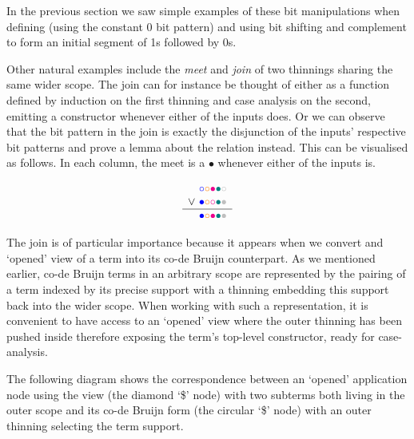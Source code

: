 In the previous section we saw simple examples of these bit manipulations when
defining  (using the constant 0 bit pattern) and
 using bit shifting and complement to form an initial segment
of 1s followed by 0s.

Other natural examples include the \emph{meet} and \emph{join} of two thinnings
sharing the same wider scope.
%
The join can for instance be thought of either as a function defined by induction
on the first thinning and case analysis on the second, emitting a 
constructor whenever either of the inputs does.
%
Or we can observe that the bit pattern in the join is exactly the disjunction of
the inputs' respective bit patterns and prove a lemma about the 
relation instead.
%
This can be visualised as follows. In each column, the meet is a
$\bullet$ whenever either of the inputs is.

\[
\begin{array}{c@{~}l}
& \color{blue}{\circ}\color{orange}{\circ}\color{magenta}{\bullet}\color{teal}{\bullet}\color{lightgray}{\circ} \\
  \vee & \color{blue}{\bullet}\color{orange}{\circ}\color{magenta}{\circ}\color{teal}{\bullet}\color{lightgray}{\bullet} \\
  \hline
  & \color{blue}{\bullet}\color{orange}{\circ}\color{magenta}{\bullet}\color{teal}{\bullet}\color{lightgray}{\bullet} \\
\end{array}
\]

The join is of particular importance because it appears when we convert and `opened'
view of a term into its co-de Bruijn counterpart.
%
As we mentioned earlier, co-de Bruijn terms in an arbitrary scope are represented by
the pairing of a term indexed by its precise support with a thinning embedding this
support back into the wider scope.
%
When working with such a representation, it is convenient to have access to an
`opened' view where the outer thinning has been pushed inside therefore exposing
the term's top-level constructor, ready for case-analysis.


The following diagram shows the correspondence between an `opened' application node
using the view (the diamond `\$' node) with two subterms both living in the outer scope
and its co-de Bruijn form (the circular `\$' node) with an outer thinning selecting the
term support.

\noindent
\begin{minipage}{.45\textwidth}\center
\end{minipage}\hfill
\begin{minipage}{.45\textwidth}\center
\end{minipage}

